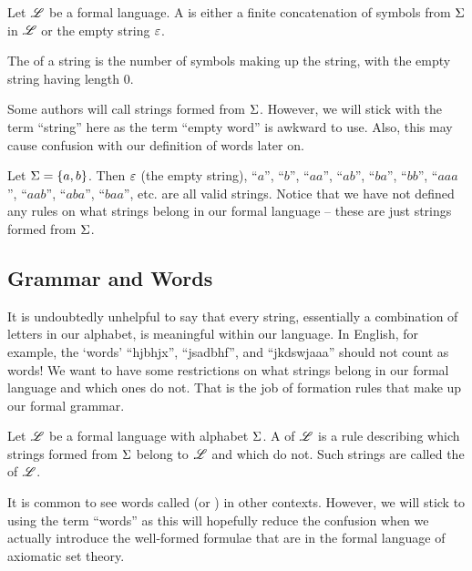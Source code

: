 \begin{definition}[String]
    Let $\mathscr{L}$ be a formal language. A  is either a finite concatenation of symbols from $\Sigma$ in $\mathscr{L}$ or the empty string $\varepsilon$.

    The  of a string is the number of symbols making up the string, with the empty string having length 0.
\end{definition}
\begin{remark}[Words]
    Some authors will call strings  formed from $\Sigma$. However, we will stick with the term ``string'' here as the term ``empty word'' is awkward to use. Also, this may cause confusion with our definition of words later on.
\end{remark}

\begin{example}
    Let $\Sigma = \{a, b\}$. Then $\varepsilon$ (the empty string), ``$a$'', ``$b$'', ``$aa$'', ``$ab$'', ``$ba$'', ``$bb$'', ``$aaa$'', ``$aab$'', ``$aba$'', ``$baa$'', etc. are all valid strings. Notice that we have not defined any rules on what strings belong in our formal language -- these are just strings formed from $\Sigma$.
\end{example}

\subsection{Grammar and Words}
It is undoubtedly unhelpful to say that every string, essentially a combination of letters in our alphabet, is meaningful within our language. In English, for example, the `words' ``hjbhjx'', ``jsadbhf'', and ``jkdswjaaa'' should not count as words! We want to have some restrictions on what strings belong in our formal language and which ones do not. That is the job of formation rules that make up our formal grammar.

\begin{definition}
    Let $\mathscr{L}$ be a formal language with alphabet $\Sigma$. A  of $\mathscr{L}$ is a rule describing which strings formed from $\Sigma$ belong to $\mathscr{L}$ and which do not. Such strings are called the  of $\mathscr{L}$.
\end{definition}
\begin{remark}
    It is common to see words called  (or ) in other contexts. However, we will stick to using the term ``words'' as this will hopefully reduce the confusion when we actually introduce the well-formed formulae that are in the formal language of axiomatic set theory.
\end{remark}

